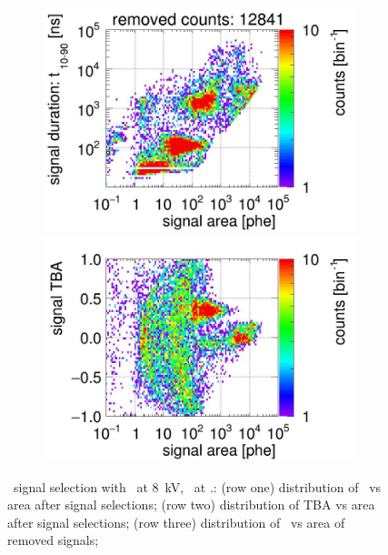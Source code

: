 \begin{landscape}
\begin{figure}[!p]
\begin{subfigure}[t]{0.33\textwidth}
			\includegraphics[width=\figurewidth,clip,trim={0 98 0 10}]{Figures/GasTest/CutsValid/res64765/pdpaX29Vecfig64765.jpg}
			\includegraphics[width=\figurewidth,clip,trim={0 0 0 40}]{Figures/GasTest/CutsValid/res64765/tbapaX29Vecfig64765.jpg}
			\caption{}
			\label{fig:signal selection dv 08 04}
		\end{subfigure}
		\caption[\gtest\ signal selection with \opdv\ at \SI{8}{\kV}, \opgd\ at \standarddensity .]{\gtest\ signal selection with \opdv\ at \SI{8}{\kV}, \opgd\ at \standarddensity .: 
			(row one) distribution of \rpdshort\ vs area after signal selections;
			(row two) distribution of TBA vs area after signal selections;
			(row three) distribution of \rpdshort\ vs area of removed signals;
}
\end{figure}
\end{landscape}
